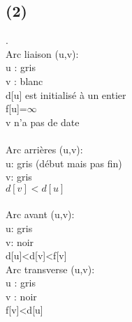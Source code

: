 \documentclass{article}
\begin{document}
\subsection*{(2)}
. \\
Arc liaison (u,v): \\
u : gris \\
v : blanc \\
d[u] est initialisé à un entier \\
f[u]=$\infty$ \\
v n'a pas de date \\
\\ 
Arc arrières (u,v): \\
u: gris (début mais pas fin) \\
v: gris \\
$d[v]<d[u]$ \\ 
\\
Arc avant (u,v): \\
u: gris \\
v: noir \\
d[u]<d[v]<f[v]
\\
Arc transverse (u,v): \\
u : gris \\
v : noir \\
f[v]<d[u]  
\end{document}
